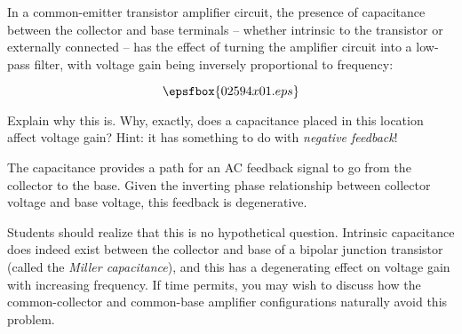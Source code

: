 

In a common-emitter transistor amplifier circuit, the presence of capacitance between the collector and base terminals -- whether intrinsic to the transistor or externally connected -- has the effect of turning the amplifier circuit into a low-pass filter, with voltage gain being inversely proportional to frequency:

$$\epsfbox{02594x01.eps}$$

Explain why this is.  Why, exactly, does a capacitance placed in this location affect voltage gain?  Hint: it has something to do with {\it negative feedback}!







The capacitance provides a path for an AC feedback signal to go from the collector to the base.  Given the inverting phase relationship between collector voltage and base voltage, this feedback is degenerative.







Students should realize that this is no hypothetical question.  Intrinsic capacitance does indeed exist between the collector and base of a bipolar junction transistor (called the {\it Miller capacitance}), and this has a degenerating effect on voltage gain with increasing frequency.  If time permits, you may wish to discuss how the common-collector and common-base amplifier configurations naturally avoid this problem.




